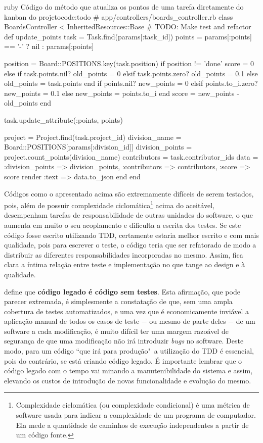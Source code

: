 \begin{mycode}{ruby}%
{Código do método que atualiza os pontos de uma tarefa diretamente do kanban do projeto}{code:todo}
# app/controllers/boards_controller.rb
class BoardsController < InheritedResources::Base
  # TODO: Make test and refactor
  def update_points
    task = Task.find(params[:task_id])
    points = params[:points] == '-' ? nil : params[:points]

    position = Board::POSITIONS.key(task.position)
    if position != 'done'
      score = 0
    else
      if task.points.nil?
        old_points = 0
      elsif task.points.zero?
        old_points = 0.1
      else
        old_points = task.points
      end
      if points.nil?
        new_points = 0
      elsif points.to_i.zero?
        new_points = 0.1
      else
        new_points = points.to_i
      end
      score = new_points - old_points
    end

    task.update_attribute(:points, points)

    project = Project.find(task.project_id)
    division_name = Board::POSITIONS[params[:division_id]]
    division_points = project.count_points(division_name)
    contributors = task.contributor_ids
    data = { :division_points => division_points,
             :contributors => contributors,
             :score => score }
    render :text => data.to_json
  end
end
\end{mycode}

Códigos como o apresentado acima são extremamente difíceis de serem testados, pois, além de possuir complexidade ciclomática\footnote{Complexidade ciclomática (ou complexidade condicional) é uma métrica de software usada para indicar a complexidade de um programa de computador. Ela mede a quantidade de caminhos de execução independentes a partir de um código fonte.} acima do aceitável, desempenham tarefas de responsabilidade de outras unidades do software, o que aumenta em muito o seu acoplamento e dificulta a escrita dos testes. Se este código fosse escrito utilizando TDD, certamente estaria melhor escrito e com mais qualidade, pois para escrever o teste, o código teria que ser refatorado de modo a distribuir as diferentes responsabilidades incorporadas no mesmo. Assim, fica clara a íntima relação entre teste e implementação no que tange ao design e à qualidade.

 define que \textbf{código legado é código sem testes}. Esta afirmação, que pode parecer extremada, é simplesmente a constatação de que, sem uma ampla cobertura de testes automatizados, e uma vez que é economicamente inviável a aplicação manual de todos os casos de teste $-$ ou mesmo de parte deles $-$ de um software a cada modificação, é muito difícil ter uma margem razoável de segurança de que uma modificação não irá introduzir \textit{bugs} no software. Deste modo, para um código ``que irá para produção"\ a utilização do TDD é essencial, pois do contrário, se está criando código legado. É importante lembrar que o código legado com o tempo vai minando a manutenibilidade do sistema e assim, elevando os custos de introdução de novas funcionalidade e evolução do mesmo.

